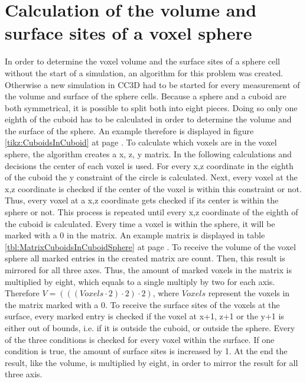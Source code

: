 \section{Calculation of the volume and surface sites of a voxel sphere}\label{sec:CreatedAlgorithm}
In order to determine the voxel volume and the surface sites of a sphere cell without the start of a simulation, an algorithm for this problem was created. Otherwise a new simulation in \ac{CC3D} had to be started for every measurement of the volume and surface of the sphere cells. \newline
Because a sphere and a cuboid are both symmetrical, it is possible to split both into eight pieces. Doing so only one eighth of the cuboid has to be calculated in order to determine the volume and the surface of the sphere. An example therefore is displayed in figure \ref{tikz:CuboidsInCuboid} at page \pageref{tikz:CuboidsInCuboid}. \newline
To calculate which voxels are in the voxel sphere, the algorithm creates a x, z, y matrix. In the following calculations and decisions the center of each voxel is used. For every x,z coordinate in the eighth of the cuboid the y constraint of the circle is calculated. Next, every voxel at the x,z coordinate is checked if the center of the voxel is within this constraint or not. Thus, every voxel at a x,z coordinate gets checked if its center is within the sphere or not. This process is repeated until every x,z coordinate of the eighth of the cuboid is calculated. Every time a voxel is within the sphere, it will be marked with a 0 in the matrix. An example matrix is displayed in table \ref{tbl:MatrixCuboidsInCuboidSphere} at page \pageref{tbl:MatrixCuboidsInCuboidSphere}. \newline
To receive the volume of the voxel sphere all marked entries in the created matrix are count. Then, this result is mirrored for all three axes. Thus, the amount of marked voxels in the matrix is multiplied by eight, which equals to a single multiply by two for each axis. Therefore $V=(((Voxels \cdot 2) \cdot 2) \cdot 2)$, where $Voxels$ represent the voxels in the matrix marked with a 0.
To receive the surface sites of the voxels at the surface, every marked entry is checked if the voxel at x+1, z+1 or the y+1 is either out of bounds, i.e. if it is outside the cuboid, or outside the sphere. Every of the three conditions is checked for every voxel within the surface. If one condition is true, the amount of surface sites is increased by 1. At the end the result, like the volume, is multiplied by eight, in order to mirror the result for all three axis.



